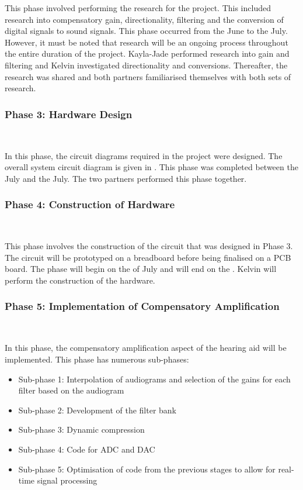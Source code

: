 \documentclass[10pt,twocolumn]{witseiepaper}
\begin{document}
This phase involved performing the research for the project. This included research into compensatory gain, directionality, filtering and the conversion of digital signals to sound signals. This phase occurred from the  June to the  July. However, it must be noted that research will be an ongoing process throughout the entire duration of the project. Kayla-Jade performed research into gain and filtering and Kelvin investigated directionality and conversions. Thereafter, the research was shared and both partners familiarised themselves with both sets of research.

\subsubsection*{Phase 3: Hardware Design } $    $

In this phase, the circuit diagrams required in the project were designed. The overall system circuit diagram is given in . This phase was completed between the  July and the  July. The two partners performed this phase together.

\subsubsection*{Phase 4: Construction of Hardware } $    $

This phase involves the construction of the circuit that was designed in Phase 3. The circuit will be prototyped on a breadboard before being finalised on a PCB board. The phase will begin on the  of July and will end on the . Kelvin will perform the construction of the hardware.

\subsubsection*{Phase 5: Implementation of Compensatory Amplification} $    $

In this phase, the compensatory amplification aspect of the hearing aid will be implemented. This phase has numerous sub-phases:
\begin{itemize}
	\item Sub-phase 1: Interpolation of audiograms and selection of the gains for each filter based on the audiogram
	\item Sub-phase 2: Development of the filter bank
	\item Sub-phase 3: Dynamic compression
	\item Sub-phase 4: Code for ADC and DAC
	\item Sub-phase 5: Optimisation of code from the previous stages to allow for real-time signal processing
\end{itemize}
\end{document}
